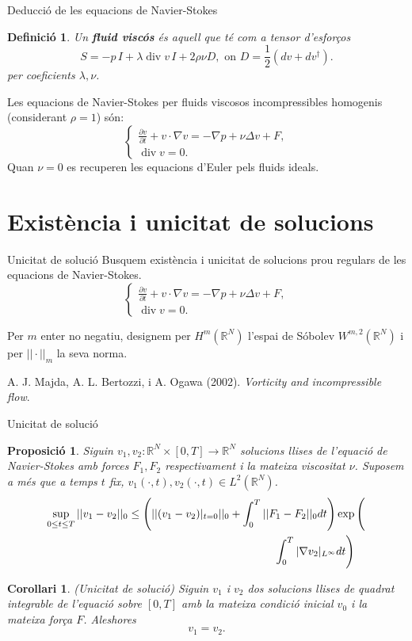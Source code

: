 \documentclass{beamer}
\DeclareMathOperator{\diver}{div}
\newtheorem{corollari}{Corol\textperiodcentered lari}
\newtheorem{definicio}{Definici\'{o}}
\newtheorem{proposicio}{Proposici\'{o}}
\begin{document}
\begin{frame}{Deducci\'{o} de les equacions de Navier-Stokes}
\begin{definicio}
Un \textbf{fluid visc\'{o}s} \'{e}s aquell que t\'{e} com a tensor d'esfor\c{c}os
\[S=-p\,I+\lambda\diver v\,I+2\rho\nu D,\text{ on }D=\frac{1}{2}(dv+dv^{\dagger}).\]
per coeficients $\lambda,\nu$.
\end{definicio}
\pause
Les equacions de Navier-Stokes per fluids viscosos incompressibles homogenis (considerant $\rho=1$) s\'{o}n:
\[\left\{\begin{array}{l}\displaystyle{\frac{\partial v}{\partial t}+v\cdot\nabla v=-\nabla p+\nu\Delta v+F,}\\\diver v=0.\end{array}\right.\]
\pause
Quan $\nu=0$ es recuperen les equacions d'Euler pels fluids ideals.
\end{frame}

\section{Exist\`{e}ncia i unicitat de solucions}

\begin{frame}{Unicitat de soluci\'{o}}
Busquem exist\`{e}ncia i unicitat de solucions prou regulars de les equacions de Navier-Stokes.
\[\left\{\begin{array}{l}\displaystyle{\frac{\partial v}{\partial t}+v\cdot\nabla v=-\nabla p+\nu\Delta v+F,}\\\diver v=0.\end{array}\right.\]

Per $m$ enter no negatiu, designem per $H^m(\mathbb{R}^N)$ l'espai de S\'{o}bolev $W^{m,2}(\mathbb{R}^N)$ i per $||\cdot||_m$ la seva norma.
\vspace{9mm}

A. J. Majda, A. L. Bertozzi, i A. Ogawa (2002). \emph{Vorticity and incompressible flow}.
\end{frame}

\begin{frame}{Unicitat de soluci\'{o}}
\begin{proposicio}
Siguin $v_1,v_2:\mathbb{R}^N\times[0,T]\rightarrow\mathbb{R}^N$ solucions llises de l'equaci\'{o} de Navier-Stokes amb forces $F_1,F_2$ respectivament i la mateixa viscositat $\nu$. Suposem a m\'{e}s que a temps $t$ fix, $v_1(\cdot,t),v_2(\cdot,t)\in L^2(\mathbb{R}^N)$.
\begin{align*}
\sup_{0\leq t\leq T}||v_1-v_2||_0\leq\left(||(v_1-v_2)|_{t=0}||_0+\int_0^T||F_1-F_2||_0dt\right)\exp&\left(\vphantom{\int_0^T}\right.\\
\left.\int_0^T|\nabla v_2|_{L^{\infty}}dt\right)&
\end{align*}
\end{proposicio}
\pause
\begin{corollari}
(Unicitat de soluci\'{o}) Siguin $v_1$ i $v_2$ dos solucions llises de quadrat integrable de l'equaci\'{o} sobre $[0,T]$ amb la mateixa condici\'{o} inicial $v_0$ i la mateixa for\c{c}a $F$. Aleshores
\[v_1=v_2.\]
\end{corollari}
\end{frame}
\end{document}
